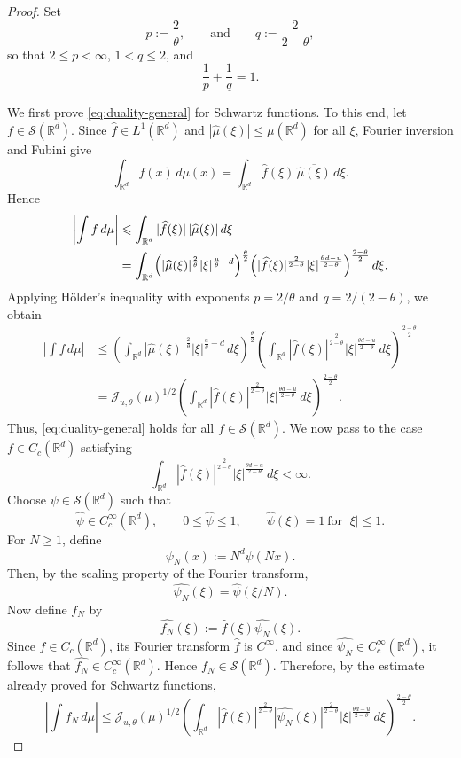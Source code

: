 \documentclass[11pt]{amsart}
\numberwithin{equation}{section}
\renewcommand{\ge}{\geqslant}
\renewcommand{\le}{\leqslant}
\renewcommand{\leq}{\leqslant}
\newcommand{\J}{\mathcal{J}}
\theoremstyle{plain}
\theoremstyle{remark}
\begin{document}
\begin{proof}
Set
\[
p:=\frac{2}{\theta},
\qquad \text{and} \qquad 
q:=\frac{2}{2-\theta},
\]
so that \(2 \leq p<\infty\), \(1<q\le 2\), and
\[
\frac1p+\frac1q=1.
\]

We first prove \eqref{eq:duality-general} for Schwartz functions.  To this end, let \(f\in \mathcal S(\mathbb R^d)\). Since \(\widehat f\in L^1(\mathbb R^d)\) and
\(|\widehat\mu(\xi)|\le \mu(\mathbb R^d)\) for all \(\xi\), Fourier inversion and Fubini give
\[
\int_{\mathbb R^d} f(x)\,d\mu(x)
=
\int_{\mathbb R^d}\widehat f(\xi)\,\overline{\widehat\mu(\xi)}\,d\xi.
\]
Hence
\begin{align*}
\left|\int f\,d\mu\right|
&\le
\int_{\mathbb R^d} |\widehat f(\xi)|\,|\widehat\mu(\xi)|\,d\xi \\
&=
\int_{\mathbb R^d}
\Bigl(|\widehat\mu(\xi)|^{\frac2\theta}|\xi|^{\frac{u}{\theta}-d}\Bigr)^{\frac{\theta}{2}}
\Bigl(|\widehat f(\xi)|^{\frac{2}{2-\theta}}|\xi|^{\frac{\theta d-u}{2-\theta}}\Bigr)^{\frac{2-\theta}{2}}
\,d\xi.
\end{align*}
Applying Hölder's inequality with exponents \(p=2/\theta\) and \(q=2/(2-\theta)\), we obtain
\begin{align*}
\left|\int f\,d\mu\right|
&\le
\left(
\int_{\mathbb R^d}
|\widehat\mu(\xi)|^{\frac2\theta}|\xi|^{\frac{u}{\theta}-d}\,d\xi
\right)^{\frac{\theta}{2}}
\left(
\int_{\mathbb R^d}
|\widehat f(\xi)|^{\frac{2}{2-\theta}}|\xi|^{\frac{\theta d-u}{2-\theta}}\,d\xi
\right)^{\frac{2-\theta}{2}} \\
&=
\J_{u,\theta}(\mu)^{1/2}
\left(
\int_{\mathbb R^d}
|\widehat f(\xi)|^{\frac{2}{2-\theta}}|\xi|^{\frac{\theta d-u}{2-\theta}}\,d\xi
\right)^{\frac{2-\theta}{2}}.
\end{align*}
Thus, \eqref{eq:duality-general} holds for all \(f\in \mathcal S(\mathbb R^d)\).  We now pass to the case \(f\in C_c(\mathbb R^d)\) satisfying
\[
\int_{\mathbb R^d}
|\widehat f(\xi)|^{\frac{2}{2-\theta}}|\xi|^{\frac{\theta d-u}{2-\theta}}\,d\xi
<\infty.
\]
Choose \(\psi\in \mathcal S(\mathbb R^d)\) such that
\[
\widehat\psi\in C_c^\infty(\mathbb R^d),\qquad
0\le \widehat\psi\le 1,\qquad
\widehat\psi(\xi)=1 \ \text{for } |\xi|\le 1.
\]
For \(N\ge 1\), define
\[
\psi_N(x):=N^d\psi(Nx).
\]
Then, by the scaling property of the Fourier transform,
\[
\widehat{\psi_N}(\xi)=\widehat\psi(\xi/N).
\]
Now define \(f_N\) by
\[
\widehat{f_N}(\xi):=\widehat f(\xi)\widehat{\psi_N}(\xi).
\]
Since \(f\in C_c(\mathbb R^d)\), its Fourier transform \(\widehat f\) is \(C^\infty\), and since
\(\widehat{\psi_N}\in C_c^\infty(\mathbb R^d)\), it follows that
\(\widehat{f_N}\in C_c^\infty(\mathbb R^d)\). Hence \(f_N\in \mathcal S(\mathbb R^d)\). Therefore,
by the estimate already proved for Schwartz functions,
\begin{equation}\label{eq:duality-general-fN}
\left|\int f_N\,d\mu\right|
\le
\J_{u,\theta}(\mu)^{1/2}
\left(
\int_{\mathbb R^d}
|\widehat f(\xi)|^{\frac{2}{2-\theta}}
|\widehat{\psi_N}(\xi)|^{\frac{2}{2-\theta}}
|\xi|^{\frac{\theta d-u}{2-\theta}}\,d\xi
\right)^{\frac{2-\theta}{2}}.
\end{equation}


\end{proof}
\end{document}
